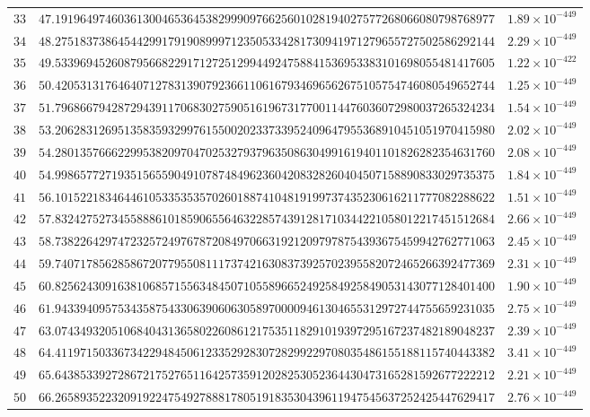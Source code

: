 \documentclass[12pt,reqno]{amsart}
\theoremstyle{remark}
\begin{document}
\begin{longtable}{clc}
$33$ & $47.1919649746036130046536453829990976625601028194027577268066080798768977$ & $1.89\times 10^{-449}$ \\
$34$ & $48.2751837386454429917919089997123505334281730941971279655727502586292144$ & $2.29\times 10^{-449}$ \\
$35$ & $49.5339694526087956682291712725129944924758841536953383101698055481417605$ & $1.22\times 10^{-422}$ \\
$36$ & $50.4205313176464071278313907923661106167934696562675105754746080549652744$ & $1.25\times 10^{-449}$ \\
$37$ & $51.7968667942872943911706830275905161967317700114476036072980037265324234$ & $1.54\times 10^{-449}$ \\
$38$ & $53.2062831269513583593299761550020233733952409647955368910451051970415980$ & $2.02\times 10^{-449}$ \\
$39$ & $54.2801357666229953820970470253279379635086304991619401101826282354631760$ & $2.08\times 10^{-449}$ \\
$40$ & $54.9986577271935156559049107874849623604208328260404507158890833029735375$ & $1.84\times 10^{-449}$ \\
$41$ & $56.1015221834644610533535357026018874104819199737435230616211777082288622$ & $1.51\times 10^{-449}$ \\
$42$ & $57.8324275273455888610185906556463228574391281710344221058012217451512684$ & $2.66\times 10^{-449}$ \\
$43$ & $58.7382264297472325724976787208497066319212097978754393675459942762771063$ & $2.45\times 10^{-449}$ \\
$44$ & $59.7407178562858672077955081117374216308373925702395582072465266392477369$ & $2.31\times 10^{-449}$ \\
$45$ & $60.8256243091638106857155634845071055896652492584925849053143077128401400$ & $1.90\times 10^{-449}$ \\
$46$ & $61.9433940957534358754330639060630589700009461304655312972744755659231035$ & $2.75\times 10^{-449}$ \\
$47$ & $63.0743493205106840431365802260861217535118291019397295167237482189048237$ & $2.39\times 10^{-449}$ \\
$48$ & $64.4119715033673422948450612335292830728299229708035486155188115740443382$ & $3.41\times 10^{-449}$ \\
$49$ & $65.6438533927286721752765116425735912028253052364430473165281592677222212$ & $2.21\times 10^{-449}$ \\
$50$ & $66.2658935223209192247549278881780519183530439611947545637252425447629417$ & $2.76\times 10^{-449}$ \\

\end{longtable}
\end{document}

